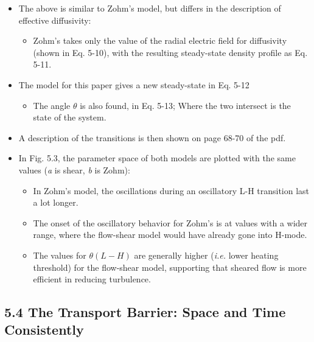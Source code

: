 \documentclass[a4paper]{article}
\begin{document}
\begin{itemize}
\item
  The above is similar to Zohm's model, but differs in the description
  of effective diffusivity:

  \begin{itemize}
  \itemsep1pt\parskip0pt
  \item
    Zohm's takes only the value of the radial electric field for
    diffusivity (shown in Eq. 5-10), with the resulting steady-state
    density profile as Eq. 5-11.
  \end{itemize}
\item
  The model for this paper gives a new steady-state in Eq. 5-12

  \begin{itemize}
  \itemsep1pt\parskip0pt
  \item
    The angle $\theta$ is also found, in Eq. 5-13; Where the two
    intersect is the state of the system.
  \end{itemize}
\item
  A description of the transitions is then shown on page 68-70 of the
  pdf.
\item
  In Fig. 5.3, the parameter space of both models are plotted with the
  same values (\emph{a} is shear, \emph{b} is Zohm):

  \begin{itemize}
  \item
    In Zohm's model, the oscillations during an oscillatory L-H
    transition last a lot longer.
  \item
    The onset of the oscillatory behavior for Zohm's is at values with a
    wider range, where the flow-shear model would have already gone into
    H-mode.
  \item
    The values for $\theta(L-H)$ are generally higher (\emph{i.e.} lower
    heating threshold) for the flow-shear model, supporting that sheared
    flow is more efficient in reducing turbulence.
  \end{itemize}
\end{itemize}

\subsection{5.4 The Transport Barrier: Space and Time
Consistently}\label{the-transport-barrier-space-and-time-consistently}
\end{document}
